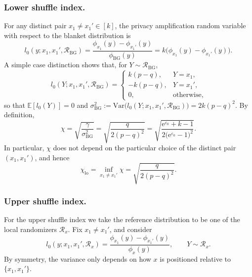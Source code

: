 \documentclass{article}
\theoremstyle{plain}
\theoremstyle{definition}
\begin{document}
\subsubsection{Lower shuffle index.}
For any distinct pair $x_1\neq x_1'\in[k]$, the privacy amplification
random variable with respect to the blanket distribution is
\[
  l_0(y;x_1,x_1',\mathcal R_{\mathrm{BG}})
  = \frac{\phi_{x_1}(y)-\phi_{x_1'}(y)}{\phi_{\mathrm{BG}}(y)}
  = k\bigl(\phi_{x_1}(y)-\phi_{x_1'}(y)\bigr).
\]
A simple case distinction shows that, for $Y\sim\mathcal R_{\mathrm{BG}}$,
\[
  l_0(Y;x_1,x_1',\mathcal R_{\mathrm{BG}})
  =
  \begin{cases}
    k(p-q), & Y=x_1,\\
    -k(p-q), & Y=x_1',\\
    0, & \text{otherwise},
  \end{cases}
\]
so that $\mathbb E[l_0(Y)]=0$ and
$
  \sigma_{\mathrm{BG}}^2
  := \mathrm{Var}\bigl(l_0(Y;x_1,x_1',\mathcal R_{\mathrm{BG}})\bigr)
  = 2k(p-q)^2.
$
By definition,
\[
  \chi
  = \sqrt{\frac{\gamma}{\sigma_{\mathrm{BG}}^2}}
  = \sqrt{\frac{q}{2(p-q)^2}}
  = \sqrt{\frac{\mathrm e^{\varepsilon_0}+k-1}{2\bigl(\mathrm e^{\varepsilon_0}-1\bigr)^2}}.
\]
In particular, $\chi$ does not depend on the
particular choice of the distinct pair $(x_1,x_1')$, and hence
\[
  \chi_{\mathrm{lo}}
  = \inf_{x_1\neq x_1'} \chi
  = \sqrt{\frac{q}{2(p-q)^2}}.
\]

\subsubsection{Upper shuffle index.}
For the upper shuffle index we take the reference distribution to be one of
the local randomizers $\mathcal R_x$. Fix $x_1\neq x_1'$, and consider
\[
  l_0(y;x_1,x_1',\mathcal R_x)
  = \frac{\phi_{x_1}(y)-\phi_{x_1'}(y)}{\phi_x(y)},
  \qquad Y\sim\mathcal R_x.
\]
By symmetry, the variance only depends on how $x$ is positioned relative to
$\{x_1,x_1'\}$.
\end{document}
